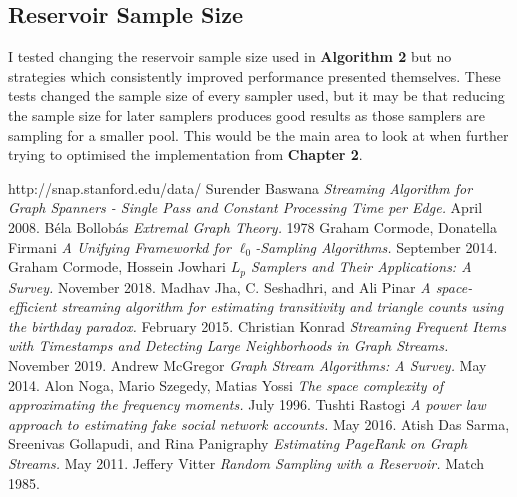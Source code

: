 \documentclass[11pt,twoside,a4paper]{report}
\begin{document}
\subsection*{Reservoir Sample Size}
I tested changing the reservoir sample size used in \textbf{Algorithm 2} but no strategies which consistently improved performance presented themselves. These tests changed the sample size of every sampler used, but it may be that reducing the sample size for later samplers produces good results as those samplers are sampling for a smaller pool. This would be the main area to look at when further trying to optimised the implementation from \textbf{Chapter 2}.

\begin{thebibliography}{4}
  http://snap.stanford.edu/data/
   Surender Baswana \textit{Streaming Algorithm for Graph Spanners - Single Pass and Constant Processing Time per Edge.} April 2008.
   B\'ela Bollob\'as \textit{Extremal Graph Theory.} 1978
   Graham Cormode, Donatella Firmani \textit{A Unifying Frameworkd for $\ell_0$-Sampling Algorithms.} September 2014.
   Graham Cormode, Hossein Jowhari \textit{$L_p$ Samplers and Their Applications: A Survey.} November 2018.
   Madhav Jha, C. Seshadhri, and Ali Pinar \textit{A space-efficient streaming algorithm for estimating transitivity and triangle counts using the birthday paradox.} February 2015.
	 Christian Konrad \textit{Streaming Frequent Items with Timestamps and Detecting Large Neighborhoods in Graph Streams.} November 2019.
   Andrew McGregor \textit{Graph Stream Algorithms: A Survey.} May 2014.
  Alon Noga, Mario Szegedy, Matias Yossi \textit{The space complexity of approximating the frequency moments.} July 1996.
   Tushti Rastogi \textit{A power law approach to estimating fake social network accounts.} May 2016.
   Atish Das Sarma, Sreenivas Gollapudi, and Rina Panigraphy \textit{Estimating PageRank on Graph Streams.} May 2011.
   Jeffery Vitter \textit{Random Sampling with a Reservoir.} Match 1985.
\end{thebibliography}
\end{document}
